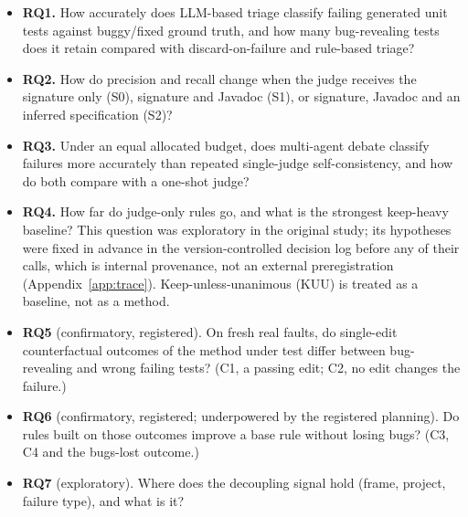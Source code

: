 \documentclass[pdflatex,iicol,sn-mathphys-num]{sn-jnl}
\begin{document}
\begin{itemize}
\item \textbf{RQ1.} How accurately does LLM-based triage classify failing generated unit tests against buggy/fixed ground truth, and how many bug-revealing tests does it retain compared with discard-on-failure and rule-based triage?
\item \textbf{RQ2.} How do precision and recall change when the judge receives the signature only (S0), signature and Javadoc (S1), or signature, Javadoc and an inferred specification (S2)?
\item \textbf{RQ3.} Under an equal allocated budget, does multi-agent debate classify failures more accurately than repeated single-judge self-consistency, and how do both compare with a one-shot judge?
\item \textbf{RQ4.} How far do judge-only rules go, and what is the strongest keep-heavy baseline? This question was exploratory in the original study; its hypotheses were fixed in advance in the version-controlled decision log before any of their calls, which is internal provenance, not an external preregistration (Appendix~\ref{app:trace}). Keep-unless-unanimous (KUU) is treated as a baseline, not as a method.
\item \textbf{RQ5} (confirmatory, registered). On fresh real faults, do single-edit counterfactual outcomes of the method under test differ between bug-revealing and wrong failing tests? (C1, a passing edit; C2, no edit changes the failure.)
\item \textbf{RQ6} (confirmatory, registered; underpowered by the registered planning). Do rules built on those outcomes improve a base rule without losing bugs? (C3, C4 and the bugs-lost outcome.)
\item \textbf{RQ7} (exploratory). Where does the decoupling signal hold (frame, project, failure type), and what is it?
\end{itemize}
\end{document}
